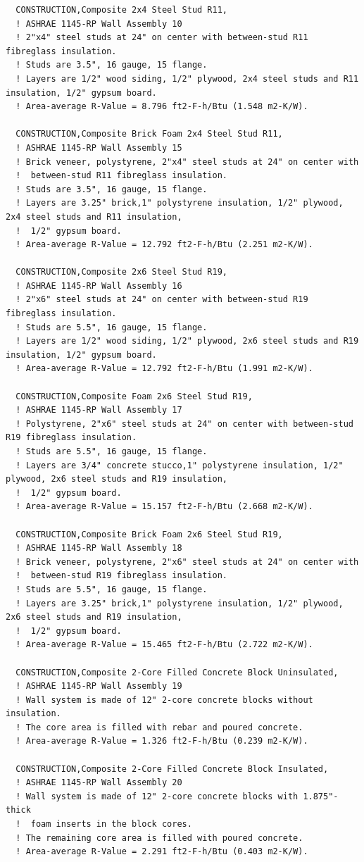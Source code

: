 \begin{lstlisting}
  CONSTRUCTION,Composite 2x4 Steel Stud R11,
  ! ASHRAE 1145-RP Wall Assembly 10
  ! 2"x4" steel studs at 24" on center with between-stud R11 fibreglass insulation.
  ! Studs are 3.5", 16 gauge, 15 flange.
  ! Layers are 1/2" wood siding, 1/2" plywood, 2x4 steel studs and R11 insulation, 1/2" gypsum board.
  ! Area-average R-Value = 8.796 ft2-F-h/Btu (1.548 m2-K/W).

  CONSTRUCTION,Composite Brick Foam 2x4 Steel Stud R11,
  ! ASHRAE 1145-RP Wall Assembly 15
  ! Brick veneer, polystyrene, 2"x4" steel studs at 24" on center with
  !  between-stud R11 fibreglass insulation.
  ! Studs are 3.5", 16 gauge, 15 flange.
  ! Layers are 3.25" brick,1" polystyrene insulation, 1/2" plywood, 2x4 steel studs and R11 insulation,
  !  1/2" gypsum board.
  ! Area-average R-Value = 12.792 ft2-F-h/Btu (2.251 m2-K/W).

  CONSTRUCTION,Composite 2x6 Steel Stud R19,
  ! ASHRAE 1145-RP Wall Assembly 16
  ! 2"x6" steel studs at 24" on center with between-stud R19 fibreglass insulation.
  ! Studs are 5.5", 16 gauge, 15 flange.
  ! Layers are 1/2" wood siding, 1/2" plywood, 2x6 steel studs and R19 insulation, 1/2" gypsum board.
  ! Area-average R-Value = 12.792 ft2-F-h/Btu (1.991 m2-K/W).

  CONSTRUCTION,Composite Foam 2x6 Steel Stud R19,
  ! ASHRAE 1145-RP Wall Assembly 17
  ! Polystyrene, 2"x6" steel studs at 24" on center with between-stud R19 fibreglass insulation.
  ! Studs are 5.5", 16 gauge, 15 flange.
  ! Layers are 3/4" concrete stucco,1" polystyrene insulation, 1/2" plywood, 2x6 steel studs and R19 insulation,
  !  1/2" gypsum board.
  ! Area-average R-Value = 15.157 ft2-F-h/Btu (2.668 m2-K/W).

  CONSTRUCTION,Composite Brick Foam 2x6 Steel Stud R19,
  ! ASHRAE 1145-RP Wall Assembly 18
  ! Brick veneer, polystyrene, 2"x6" steel studs at 24" on center with
  !  between-stud R19 fibreglass insulation.
  ! Studs are 5.5", 16 gauge, 15 flange.
  ! Layers are 3.25" brick,1" polystyrene insulation, 1/2" plywood, 2x6 steel studs and R19 insulation,
  !  1/2" gypsum board.
  ! Area-average R-Value = 15.465 ft2-F-h/Btu (2.722 m2-K/W).

  CONSTRUCTION,Composite 2-Core Filled Concrete Block Uninsulated,
  ! ASHRAE 1145-RP Wall Assembly 19
  ! Wall system is made of 12" 2-core concrete blocks without insulation.
  ! The core area is filled with rebar and poured concrete.
  ! Area-average R-Value = 1.326 ft2-F-h/Btu (0.239 m2-K/W).

  CONSTRUCTION,Composite 2-Core Filled Concrete Block Insulated,
  ! ASHRAE 1145-RP Wall Assembly 20
  ! Wall system is made of 12" 2-core concrete blocks with 1.875"-thick
  !  foam inserts in the block cores.
  ! The remaining core area is filled with poured concrete.
  ! Area-average R-Value = 2.291 ft2-F-h/Btu (0.403 m2-K/W).
\end{lstlisting}

